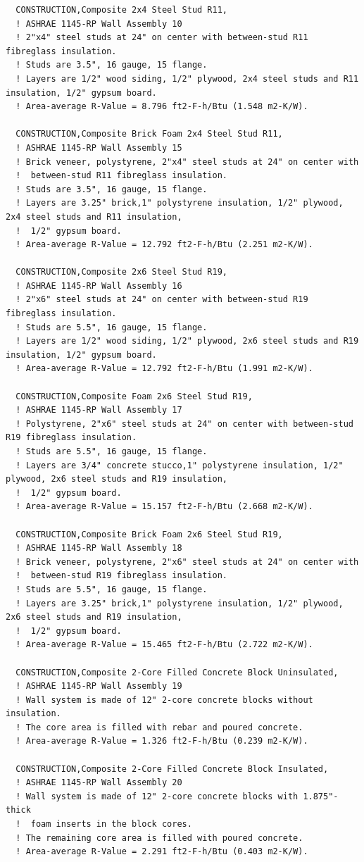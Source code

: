 \begin{lstlisting}
  CONSTRUCTION,Composite 2x4 Steel Stud R11,
  ! ASHRAE 1145-RP Wall Assembly 10
  ! 2"x4" steel studs at 24" on center with between-stud R11 fibreglass insulation.
  ! Studs are 3.5", 16 gauge, 15 flange.
  ! Layers are 1/2" wood siding, 1/2" plywood, 2x4 steel studs and R11 insulation, 1/2" gypsum board.
  ! Area-average R-Value = 8.796 ft2-F-h/Btu (1.548 m2-K/W).

  CONSTRUCTION,Composite Brick Foam 2x4 Steel Stud R11,
  ! ASHRAE 1145-RP Wall Assembly 15
  ! Brick veneer, polystyrene, 2"x4" steel studs at 24" on center with
  !  between-stud R11 fibreglass insulation.
  ! Studs are 3.5", 16 gauge, 15 flange.
  ! Layers are 3.25" brick,1" polystyrene insulation, 1/2" plywood, 2x4 steel studs and R11 insulation,
  !  1/2" gypsum board.
  ! Area-average R-Value = 12.792 ft2-F-h/Btu (2.251 m2-K/W).

  CONSTRUCTION,Composite 2x6 Steel Stud R19,
  ! ASHRAE 1145-RP Wall Assembly 16
  ! 2"x6" steel studs at 24" on center with between-stud R19 fibreglass insulation.
  ! Studs are 5.5", 16 gauge, 15 flange.
  ! Layers are 1/2" wood siding, 1/2" plywood, 2x6 steel studs and R19 insulation, 1/2" gypsum board.
  ! Area-average R-Value = 12.792 ft2-F-h/Btu (1.991 m2-K/W).

  CONSTRUCTION,Composite Foam 2x6 Steel Stud R19,
  ! ASHRAE 1145-RP Wall Assembly 17
  ! Polystyrene, 2"x6" steel studs at 24" on center with between-stud R19 fibreglass insulation.
  ! Studs are 5.5", 16 gauge, 15 flange.
  ! Layers are 3/4" concrete stucco,1" polystyrene insulation, 1/2" plywood, 2x6 steel studs and R19 insulation,
  !  1/2" gypsum board.
  ! Area-average R-Value = 15.157 ft2-F-h/Btu (2.668 m2-K/W).

  CONSTRUCTION,Composite Brick Foam 2x6 Steel Stud R19,
  ! ASHRAE 1145-RP Wall Assembly 18
  ! Brick veneer, polystyrene, 2"x6" steel studs at 24" on center with
  !  between-stud R19 fibreglass insulation.
  ! Studs are 5.5", 16 gauge, 15 flange.
  ! Layers are 3.25" brick,1" polystyrene insulation, 1/2" plywood, 2x6 steel studs and R19 insulation,
  !  1/2" gypsum board.
  ! Area-average R-Value = 15.465 ft2-F-h/Btu (2.722 m2-K/W).

  CONSTRUCTION,Composite 2-Core Filled Concrete Block Uninsulated,
  ! ASHRAE 1145-RP Wall Assembly 19
  ! Wall system is made of 12" 2-core concrete blocks without insulation.
  ! The core area is filled with rebar and poured concrete.
  ! Area-average R-Value = 1.326 ft2-F-h/Btu (0.239 m2-K/W).

  CONSTRUCTION,Composite 2-Core Filled Concrete Block Insulated,
  ! ASHRAE 1145-RP Wall Assembly 20
  ! Wall system is made of 12" 2-core concrete blocks with 1.875"-thick
  !  foam inserts in the block cores.
  ! The remaining core area is filled with poured concrete.
  ! Area-average R-Value = 2.291 ft2-F-h/Btu (0.403 m2-K/W).
\end{lstlisting}

